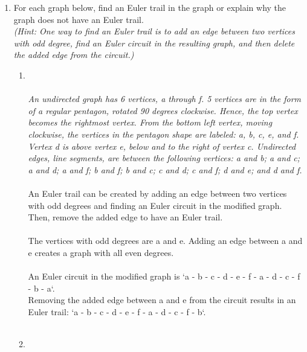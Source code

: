 \documentclass{amsart}
\theoremstyle{definition}
\theoremstyle{Exercise}
\theoremstyle{remark}
\theoremstyle{rule}
\numberwithin{equation}{section}
\begin{document}
\begin{enumerate}[label=(\alph*)]
\newpage

\item
For each graph below, find an Euler trail in the graph or explain why the graph does not have an Euler trail.\\

{\it (Hint: One way to find an Euler trail is to add an edge between two vertices with odd degree, find an Euler circuit in the resulting graph, and then delete the added edge from the circuit.)}\\
\begin{enumerate}[label=(\roman*)]
\item
{}
\\\\
{\color{blue}{\bf Figure 11:} \emph{An undirected graph has 6 vertices, a through f. 5 vertices are in the form of a regular pentagon, rotated 90 degrees clockwise. Hence, the top vertex becomes the rightmost vertex. From the bottom left vertex, moving clockwise, the vertices in the pentagon shape are labeled: a, b, c, e, and f. Vertex d is above vertex e, below and to the right of vertex c. Undirected edges, line segments, are between the following vertices: a and b; a and c; a and d; a and f; b and f; b and c; c and d; c and f; d and e; and d and f.
}
}
\\\\
An Euler trail can be created by adding an edge between two vertices with odd degrees and finding an Euler circuit in the modified graph. Then, remove the added edge to have an Euler trail.\\\\
The vertices with odd degrees are a and e. Adding an edge between a and e creates a graph with all even degrees.\\\\
An Euler circuit in the modified graph is `a - b - c - d - e - f - a - d - c - f - b - a`.\\
Removing the added edge between a and e from the circuit results in an Euler trail: `a - b - c - d - e - f - a - d - c - f - b`.
\\\\
\item {}
\end{enumerate}
\end{enumerate}
\end{document}
